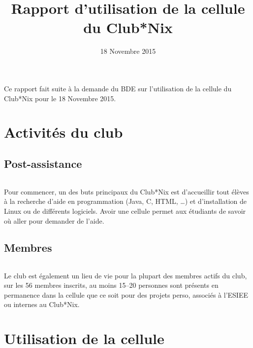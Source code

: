 \documentclass[11pt]{report}
\title{Rapport d'utilisation de la cellule du Club*Nix}
\date{18 Novembre 2015}
\begin{document}
\maketitle

\paragraph{} Ce rapport fait suite à la demande du BDE sur l'utilisation de la
cellule du Club*Nix pour le 18 Novembre 2015.

\tableofcontents

\part{Activités du club}

\chapter{Post-assistance}

\paragraph{} Pour commencer, un des buts principaux du Club*Nix est
d'accueillir tout élèves à la recherche d'aide en programmation (Java, C, HTML,
\ldots) et d'installation de Linux ou de différents logiciels. Avoir une cellule
permet aux étudiants de savoir où aller pour demander de l'aide.


\chapter{Membres}

\paragraph{} Le club est également un lieu de vie pour la plupart des membres
actifs du club, sur les 56 membres inscrits, au moins 15--20 personnes sont
présents en permanence dans la cellule que ce soit pour des projets perso,
associés à l'ESIEE ou internes au Club*Nix.

\part{Utilisation de la cellule}
\end{document}
